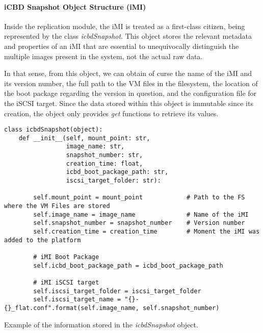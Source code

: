 \paragraph{iCBD Snapshot Object Structure (iMI)}
\label{par:icbd_snapshot}

Inside the replication module, the iMI is treated as a first-class citizen, being represented by the class \textit{icbdSnapshot}. This object stores the relevant metadata and properties of an iMI that are essential to unequivocally distinguish the multiple images present in the system, not the actual raw data.

In that sense, from this object, we can obtain of curse the name of the iMI and its version number, the full path to the VM files in the filesystem, the location of the boot package regarding the version in question, and the configuration file for the iSCSI target. Since the data stored within this object is immutable since its creation, the object only provides \textit{get} functions to retrieve its values. 

\begin{listing}[h!]
\begin{verbatim}
class icbdSnapshot(object):
    def __init__(self, mount_point: str,
                 image_name: str,
                 snapshot_number: str,
                 creation_time: float,
                 icbd_boot_package_path: str,
                 iscsi_target_folder: str):

        self.mount_point = mount_point            # Path to the FS where the VM Files are stored
        self.image_name = image_name              # Name of the iMI
        self.snapshot_number = snapshot_number    # Version number
        self.creation_time = creation_time        # Moment the iMI was added to the platform

        # iMI Boot Package
        self.icbd_boot_package_path = icbd_boot_package_path

        # iMI iSCSI target
        self.iscsi_target_folder = iscsi_target_folder
        self.iscsi_target_name = "{}-{}_flat.conf".format(self.image_name, self.snapshot_number)\end{verbatim}
\caption{Example of the information stored in the \textit{icbdSnapshot} object.}
\label{listing:icbdSnapshot_example}
\end{listing}

